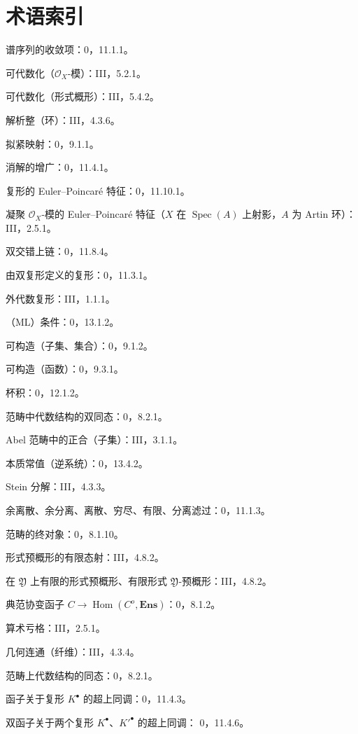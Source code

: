 \documentclass[UTF8,fontset=none,11pt,oneside,openany]{ctexbook}
\newcommand{\oldpage}[2][]{%
  \hypertarget{ega-source-page-#1-#2}{}%
  \marginnote{\scriptsize\textbf{#1}~|~#2}\ignorespaces}
\begin{document}
\clearpage
\oldpage[III]{163}
\section*{术语索引}

\begin{flushleft}
谱序列的收敛项：0，11.1.1。

可代数化（$\mathcal O_X$-模）：III，5.2.1。

可代数化（形式概形）：III，5.4.2。

解析整（环）：III，4.3.6。

拟紧映射：0，9.1.1。

消解的增广：0，11.4.1。

复形的 Euler--Poincaré 特征：0，11.10.1。

凝聚 $\mathcal O_X$-模的 Euler--Poincaré 特征（$X$ 在
$\operatorname{Spec}(A)$ 上射影，$A$ 为 Artin 环）：III，2.5.1。

双交错上链：0，11.8.4。

由双复形定义的复形：0，11.3.1。

外代数复形：III，1.1.1。

（ML）条件：0，13.1.2。

可构造（子集、集合）：0，9.1.2。

可构造（函数）：0，9.3.1。

杯积：0，12.1.2。

范畴中代数结构的双同态：0，8.2.1。

Abel 范畴中的正合（子集）：III，3.1.1。

本质常值（逆系统）：0，13.4.2。

Stein 分解：III，4.3.3。

余离散、余分离、离散、穷尽、有限、分离滤过：0，11.1.3。

范畴的终对象：0，8.1.10。

形式预概形的有限态射：III，4.8.2。

在 $\mathfrak Y$ 上有限的形式预概形、有限形式
$\mathfrak Y$-预概形：III，4.8.2。

典范协变函子 $C\to\operatorname{Hom}(C^o,\mathbf{Ens})$：0，8.1.2。

算术亏格：III，2.5.1。

几何连通（纤维）：III，4.3.4。

范畴上代数结构的同态：0，8.2.1。

函子关于复形 $K^\bullet$ 的超上同调：0，11.4.3。

双函子关于两个复形 $K^\bullet$、$K'^{\bullet}$ 的超上同调：
0，11.4.6。


\end{flushleft}
\end{document}
